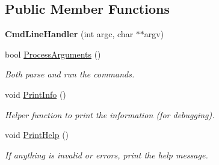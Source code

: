 \subsection*{Public Member Functions}
\begin{DoxyCompactItemize}
\item 
{\bfseries Cmd\+Line\+Handler} (int argc, char $\ast$$\ast$argv)\hypertarget{classCmdLineHandler_a2d692be72bfcdda203ba0d86a17b33c7}{}\label{classCmdLineHandler_a2d692be72bfcdda203ba0d86a17b33c7}

\item 
bool \hyperlink{classCmdLineHandler_ad65d8e5ae28b7a764a7fea5d0f89161c}{Process\+Arguments} ()
\begin{DoxyCompactList}\small\item\em Both parse and run the commands. \end{DoxyCompactList}\item 
void \hyperlink{classCmdLineHandler_ac73d82a865bf69ec97def26e34838d5b}{Print\+Info} ()\hypertarget{classCmdLineHandler_ac73d82a865bf69ec97def26e34838d5b}{}\label{classCmdLineHandler_ac73d82a865bf69ec97def26e34838d5b}

\begin{DoxyCompactList}\small\item\em Helper function to print the information (for debugging). \end{DoxyCompactList}\item 
void \hyperlink{classCmdLineHandler_af4dc913e696a0f282bc924ecef9f7e15}{Print\+Help} ()\hypertarget{classCmdLineHandler_af4dc913e696a0f282bc924ecef9f7e15}{}\label{classCmdLineHandler_af4dc913e696a0f282bc924ecef9f7e15}

\begin{DoxyCompactList}\small\item\em If anything is invalid or errors, print the help message. \end{DoxyCompactList}\end{DoxyCompactItemize}
